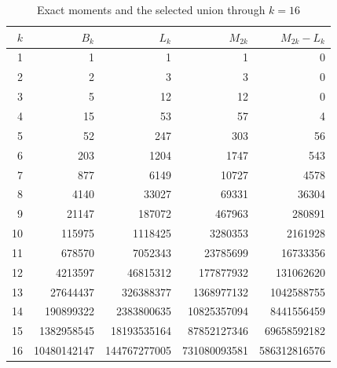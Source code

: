 \begin{table}[htbp]\centering\small
\caption{Exact moments and the selected union through $k=16$}\label{tab:exact}
\begin{tabular}{r r r r r}\toprule
$k$ & $B_k$ & $L_k$ & $M_{2k}$ & $M_{2k}-L_k$ \\\midrule
1 & 1 & 1 & 1 & 0 \\
2 & 2 & 3 & 3 & 0 \\
3 & 5 & 12 & 12 & 0 \\
4 & 15 & 53 & 57 & 4 \\
5 & 52 & 247 & 303 & 56 \\
6 & 203 & 1204 & 1747 & 543 \\
7 & 877 & 6149 & 10727 & 4578 \\
8 & 4140 & 33027 & 69331 & 36304 \\
9 & 21147 & 187072 & 467963 & 280891 \\
10 & 115975 & 1118425 & 3280353 & 2161928 \\
11 & 678570 & 7052343 & 23785699 & 16733356 \\
12 & 4213597 & 46815312 & 177877932 & 131062620 \\
13 & 27644437 & 326388377 & 1368977132 & 1042588755 \\
14 & 190899322 & 2383800635 & 10825357094 & 8441556459 \\
15 & 1382958545 & 18193535164 & 87852127346 & 69658592182 \\
16 & 10480142147 & 144767277005 & 731080093581 & 586312816576 \\
\bottomrule\end{tabular}
\end{table}
